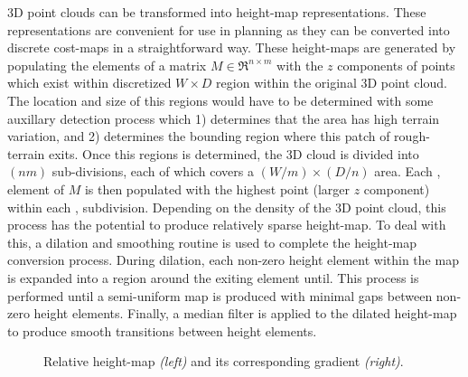 				3D point clouds can be transformed into height-map representations. These representations are convenient for use in planning as they can be converted into discrete cost-maps in a straightforward way. These height-maps are generated by populating the elements of a matrix  $M\in \Re^{n\times m}$ with the $z$ components of points which exist within discretized $W\times D$ region within the original 3D point cloud. The location and size of this regions would have to be determined with some auxillary detection process which 1) determines that the area has high terrain variation, and 2) determines the bounding region where this patch of rough-terrain exits. Once this regions is determined, the 3D cloud is divided into $(nm)$ sub-divisions, each of which covers a $(W/m) \times (D/n)$ area. Each \Ith, \Jth element of $M$ is then populated with the highest point (larger  $z$ component) within each  \Ith, \Jth subdivision. Depending on the density of the 3D point cloud, this process has the potential to produce relatively sparse height-map. To deal with this, a dilation and smoothing routine is used to complete the height-map conversion process. During dilation, each non-zero height element within the map is expanded into a region around the exiting element until. This process is performed until a semi-uniform map is produced with minimal gaps between non-zero height elements. Finally, a median filter is applied to the dilated height-map to produce smooth transitions between height elements.
				\begin{figure}[t!]
					\centering
					\caption{Relative height-map \emph{(left)} and its corresponding gradient \emph{(right)}.}
					\label{fig::heightmap_terrain_patch}
				\end{figure}
